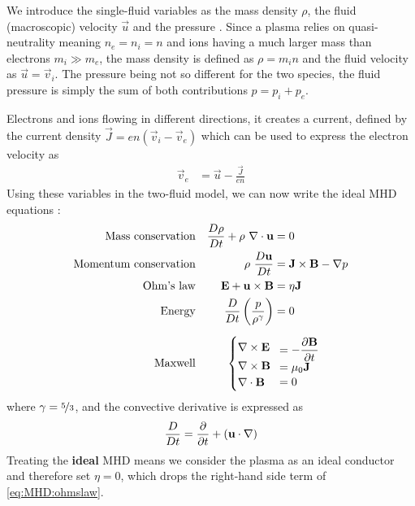 We introduce the single-fluid variables as the mass density $\rho$, the fluid (macroscopic) velocity $\vec{u}$ and the pressure \cite{freidberg}. Since a plasma relies on quasi-neutrality meaning $n_e = n_i = n$ and ions having a much larger mass than electrons $m_i \gg m_e$, the mass density is defined as $\rho = m_i n$ and the fluid velocity as $\vec{u} = \vec{v}_i$. The pressure being not so different for the two species, the fluid pressure is simply the sum of both contributions $p = p_i + p_e$.

Electrons and ions flowing in different directions, it creates a current, defined by the current density $\vec{J} = e n (\vec{v}_i - \vec{v}_e)$ which can be used to express the electron velocity as
\begin{align*}
	\vec{v}_e & = \vec{u} - \frac{\vec{J}}{e n}
\end{align*}
Using these variables in the two-fluid model, we can now write the ideal MHD equations \cite{freidberg}:
\begin{align}
	\textrm{Mass conservation}     && \DsDt{\rho} + \rho\ \div \vec{u}               & = 0                                     \label{eq:MHD:mass_cons}\\
	\textrm{Momentum conservation} && \rho\ \DsDt{\vec{u}}                           & = \crossp{\vec{J}}{\vec{B}} - \grad p   \label{eq:MHD:momentum_cons}\\
	\textrm{Ohm's law}             && \vec{E} + \crossp{\vec{u}}{\vec{B}}            & = \eta \vec{J}                          \label{eq:MHD:ohmslaw}\\
	\textrm{Energy}                && \DsDt{} \left( \frac{p}{\rho^{\gamma}} \right) & = 0                                     \label{eq:MHD:energy_cons}\\[2mm]
	\textrm{Maxwell}               && \begin{cases}
											\phantom{a}\\[-12pt]
											\curl \vec{E}\\[2pt]
											\curl \vec{B}\\
											\div  \vec{B}
                                      \end{cases}\!\!\!\!\! &   \begin{array}{l}
																	= - \dsdt{\vec{B}}\\[3pt]
																	= \mu_0 \vec{J}\\[1pt]
																	= 0
																\end{array}\label{eq:MHD:maxwells}
\end{align}
where $\gamma = \nicefrac{5}{3}$, and the convective derivative is expressed as
\begin{align*}
	\dfrac{D }{D t} = \dfrac{\partial }{\partial t} + ( \mathbf{u} \cdot \nabla )
\end{align*}
Treating the \textbf{ideal} MHD means we consider the plasma as an ideal conductor and therefore set $\eta = 0$, which drops the right-hand side term of \eqref{eq:MHD:ohmslaw}.

